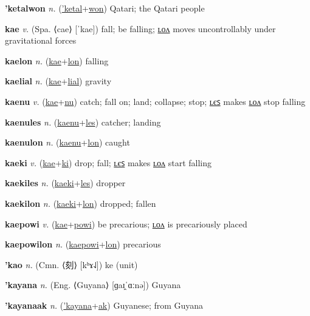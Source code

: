 \textbf{\hypertarget{'ketalwon}{'ketalwon}} \textit{n.} (\hyperlink{'ketal}{'ketal}+\allowbreak \hyperlink{won}{won})
Qatari; the Qatari people

\textbf{\hypertarget{kae}{kae}} \textit{v.} (Spa. ⟨cae⟩ [ˈkae])
fall; be falling; \hyperlink{kaelon}{ʟᴏᴧ} moves uncontrollably under gravitational forces

\textbf{\hypertarget{kaelon}{kaelon}} \textit{n.} (\hyperlink{kae}{kae}+\allowbreak \hyperlink{lon}{lon})
falling

\textbf{\hypertarget{kaelial}{kaelial}} \textit{n.} (\hyperlink{kae}{kae}+\allowbreak \hyperlink{lial}{lial})
gravity

\textbf{\hypertarget{kaenu}{kaenu}} \textit{v.} (\hyperlink{kae}{kae}+\allowbreak \hyperlink{nu}{nu})
catch; fall on; land; collapse; stop; \hyperlink{kaenules}{ʟєꜱ} makes \hyperlink{kaenulon}{ʟᴏᴧ} stop falling

\textbf{\hypertarget{kaenules}{kaenules}} \textit{n.} (\hyperlink{kaenu}{kaenu}+\allowbreak \hyperlink{les}{les})
catcher; landing

\textbf{\hypertarget{kaenulon}{kaenulon}} \textit{n.} (\hyperlink{kaenu}{kaenu}+\allowbreak \hyperlink{lon}{lon})
caught

\textbf{\hypertarget{kaeki}{kaeki}} \textit{v.} (\hyperlink{kae}{kae}+\allowbreak \hyperlink{ki}{ki})
drop; fall; \hyperlink{kaekiles}{ʟєꜱ} makes \hyperlink{kaekilon}{ʟᴏᴧ} start falling

\textbf{\hypertarget{kaekiles}{kaekiles}} \textit{n.} (\hyperlink{kaeki}{kaeki}+\allowbreak \hyperlink{les}{les})
dropper

\textbf{\hypertarget{kaekilon}{kaekilon}} \textit{n.} (\hyperlink{kaeki}{kaeki}+\allowbreak \hyperlink{lon}{lon})
dropped; fallen

\textbf{\hypertarget{kaepowi}{kaepowi}} \textit{v.} (\hyperlink{kae}{kae}+\allowbreak \hyperlink{powi}{powi})
be precarious; \hyperlink{kaepowilon}{ʟᴏᴧ} is precariously placed

\textbf{\hypertarget{kaepowilon}{kaepowilon}} \textit{n.} (\hyperlink{kaepowi}{kaepowi}+\allowbreak \hyperlink{lon}{lon})
precarious

\textbf{\hypertarget{'kao}{'kao}} \textit{n.} (Cmn. ⟨{\chinese{}刻}⟩ [kʰɤ˨˩])
ke (unit)

\textbf{\hypertarget{'kayana}{'kayana}} \textit{n.} (Eng. ⟨Guyana⟩ [ɡaɪ̯ˈɑːnə])
Guyana

\textbf{\hypertarget{'kayanaak}{'kayanaak}} \textit{n.} (\hyperlink{'kayana}{'kayana}+\allowbreak \hyperlink{ak}{ak})
Guyanese; from Guyana


